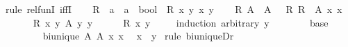 \begin{isabellebody}
%
\isadelimproof
%
\endisadelimproof
%
\isatagproof
{}\isamarkupfalse%
{\isacharparenleft}{\kern0pt}rule\ rel{\isacharunderscore}{\kern0pt}funI\ iffI{\isacharparenright}{\kern0pt}{\isacharplus}{\kern0pt}\isanewline
\ \ \isamarkupfalse%
\ R\ {\isacharcolon}{\kern0pt}{\isacharcolon}{\kern0pt}\ {\isachardoublequoteopen}{\isacharprime}{\kern0pt}a\ {\isasymRightarrow}\ {\isacharprime}{\kern0pt}a\ {\isasymRightarrow}\ bool{\isachardoublequoteclose}\ \ R{\isacharprime}{\kern0pt}\ x\ y\ x{\isacharprime}{\kern0pt}\ y{\isacharprime}{\kern0pt}\isanewline
\ \ \isamarkupfalse%
\ R{\isacharcolon}{\kern0pt}\ {\isachardoublequoteopen}{\isacharparenleft}{\kern0pt}A\ {\isacharequal}{\kern0pt}{\isacharequal}{\kern0pt}{\isacharequal}{\kern0pt}{\isachargreater}{\kern0pt}\ A\ {\isacharequal}{\kern0pt}{\isacharequal}{\kern0pt}{\isacharequal}{\kern0pt}{\isachargreater}{\kern0pt}\ {\isacharparenleft}{\kern0pt}{\isacharequal}{\kern0pt}{\isacharparenright}{\kern0pt}{\isacharparenright}{\kern0pt}\ R\ R{\isacharprime}{\kern0pt}{\isachardoublequoteclose}\ \ {\isachardoublequoteopen}A\ x\ x{\isacharprime}{\kern0pt}{\isachardoublequoteclose}\isanewline
\ \ \isacommand{{\isacharbraceleft}{\kern0pt}}\isamarkupfalse%
\isanewline
\ \ \ \ \isamarkupfalse%
\ {\isachardoublequoteopen}R\isactrlsup {\isacharasterisk}{\kern0pt}\isactrlsup {\isacharasterisk}{\kern0pt}\ x\ y{\isachardoublequoteclose}\ {\isachardoublequoteopen}A\ y\ y{\isacharprime}{\kern0pt}{\isachardoublequoteclose}\isanewline
\ \ \ \ \isamarkupfalse%
\ {\isachardoublequoteopen}R{\isacharprime}{\kern0pt}\isactrlsup {\isacharasterisk}{\kern0pt}\isactrlsup {\isacharasterisk}{\kern0pt}\ x{\isacharprime}{\kern0pt}\ y{\isacharprime}{\kern0pt}{\isachardoublequoteclose}\isanewline
\ \ \ \ \isamarkupfalse%
{\isacharparenleft}{\kern0pt}induction\ arbitrary{\isacharcolon}{\kern0pt}\ y{\isacharprime}{\kern0pt}{\isacharparenright}{\kern0pt}\isanewline
\ \ \ \ \ \ \isamarkupfalse%
\ base\isanewline
\ \ \ \ \ \ \isamarkupfalse%
\ {\isacartoucheopen}bi{\isacharunderscore}{\kern0pt}unique\ A{\isacartoucheclose}\ {\isacartoucheopen}A\ x\ x{\isacharprime}{\kern0pt}{\isacartoucheclose}\ \isamarkupfalse%
\ {\isachardoublequoteopen}x{\isacharprime}{\kern0pt}\ {\isacharequal}{\kern0pt}\ y{\isacharprime}{\kern0pt}{\isachardoublequoteclose}\ \isamarkupfalse%
{\isacharparenleft}{\kern0pt}rule\ bi{\isacharunderscore}{\kern0pt}uniqueDr{\isacharparenright}{\kern0pt}\isanewline

\end{isabellebody}
